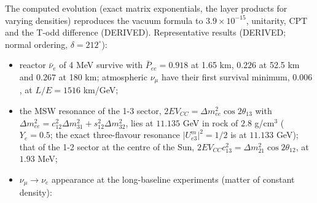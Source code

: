 \documentclass[
  10pt,
]{article}
\providecommand{\tightlist}{%
  \setlength{\itemsep}{0pt}\setlength{\parskip}{0pt}}
\begin{document}
The computed evolution (exact matrix exponentials, the layer products
for varying densities) reproduces the vacuum formula to
\(3.9\times10^{-15}\), unitarity, CPT and the T-odd difference
(DERIVED). Representative results (DERIVED; normal ordering,
\(\delta = 212^\circ\)):

\begin{itemize}
\tightlist
\item
  reactor \(\bar\nu_e\) of 4 MeV survive with \(\bar P_{ee} = 0.918\) at
  1.65 km, \(0.226\) at 52.5 km and \(0.267\) at 180 km; atmospheric
  \(\nu_\mu\) have their first survival minimum, \(0.006\), at
  \(L/E = 1516\) km/GeV;
\item
  the MSW resonance of the 1-3 sector,
  \(2EV_{CC} = \Delta m^2_{ee}\cos2\theta_{13}\) with
  \(\Delta m^2_{ee} = c_{12}^2\Delta m^2_{31} + s_{12}^2\Delta m^2_{32}\),
  lies at \(11.135\) GeV in rock of \(2.8\) g/cm\(^3\) (\(Y_e = 0.5\);
  the exact three-flavour resonance \(\lvert U^m_{e3}\rvert^2 = 1/2\) is
  at \(11.133\) GeV); that of the 1-2 sector at the centre of the Sun,
  \(2EV_{CC}c_{13}^2 = \Delta m^2_{21}\cos2\theta_{12}\), at \(1.93\)
  MeV;
\item
  \(\nu_\mu\to\nu_e\) appearance at the long-baseline experiments
  (matter of constant density):
\end{itemize}
\end{document}
